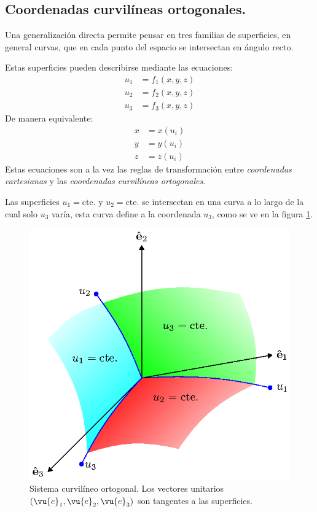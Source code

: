 
\subsection{Coordenadas curvilíneas ortogonales.}

Una generalización directa permite pensar en tres familias de superficies, en general curvas, que en cada punto del espacio se intersectan en ángulo recto.
\par
Estas superficies pueden describirse mediante las ecuaciones:
\begin{align*}
u_{1} &= f_{1}(x, y, z) \\
u_{2} &= f_{2}(x, y, z) \\
u_{3} &= f_{3}(x, y, z)
\end{align*}
De manera equivalente:
\begin{align*}
x &= x(u_{i}) \\
y &= y(u_{i}) \\
z &= z(u_{i})
\end{align*}
Estas ecuaciones son a la vez las reglas de transformación entre \emph{coordenadas cartesianas} y las \emph{coordenadas curvilíneas ortogonales}.
\par
Las superficies $u_{1} = \mbox{cte.}$ y $u_{2} = \mbox{cte.}$ se intersectan en una curva a lo largo de la cual solo $u_{3}$ varía, esta curva define a la coordenada $u_{3}$, como se ve en la figura \ref{fig:figura_Sistema_Curvilineo_Ortogonal}.
\begin{figure}[H]
   \centering
   \includegraphics[scale=1]{Imagenes/Sistema_Curvilineo_Ortogonal.eps}
   \caption{Sistema curvilíneo ortogonal. Los vectores unitarios $(\vu{e}_{1}, \vu{e}_{2}, \vu{e}_{3})$ son tangentes a las superficies.}
   \label{fig:figura_Sistema_Curvilineo_Ortogonal}
\end{figure}
